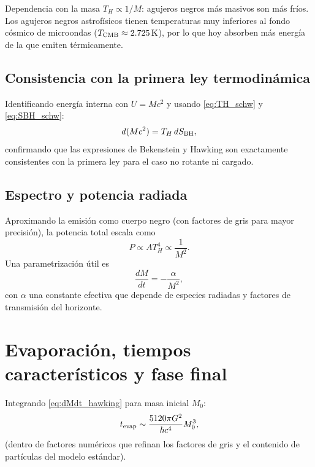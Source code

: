 \begin{observacion}{Dependencia con la masa}{}
$T_H \propto 1/M$: agujeros negros más masivos son más fríos. Los agujeros negros astrofísicos tienen temperaturas muy inferiores al fondo cósmico de microondas ($T_{\rm CMB}\approx2.725\,\si{K}$), por lo que hoy absorben más energía de la que emiten térmicamente.
\end{observacion}

\subsection{Consistencia con la primera ley termodinámica}

Identificando energía interna con $U = Mc^2$ y usando \eqref{eq:TH_schw} y \eqref{eq:SBH_schw}:
\begin{equation}
  d(Mc^2) = T_H\,dS_{\rm BH},
\end{equation}
confirmando que las expresiones de Bekenstein y Hawking son exactamente consistentes con la primera ley para el caso no rotante ni cargado.

\subsection{Espectro y potencia radiada}

Aproximando la emisión como cuerpo negro (con factores de gris para mayor precisión), la potencia total escala como
\begin{equation}
  P \propto A T_H^4 \propto \frac{1}{M^2}.
\end{equation}
Una parametrización útil es
\begin{equation}
  \frac{dM}{dt} = -\frac{\alpha}{M^2},
  \label{eq:dMdt_hawking}
\end{equation}
con $\alpha$ una constante efectiva que depende de especies radiadas y factores de transmisión del horizonte.

\section{Evaporación, tiempos característicos y fase final}
\label{sec:evaporacion_tiempos}

Integrando \eqref{eq:dMdt_hawking} para masa inicial $M_0$:
\begin{equation}
  t_{\rm evap} \sim \frac{5120\pi G^2}{\hbar c^4}M_0^3,
  \label{eq:tiempo_evap_cap9}
\end{equation}
(dentro de factores numéricos que refinan los factores de gris y el contenido de partículas del modelo estándar).

